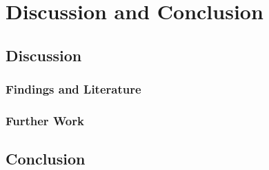 
\chapter{Discussion and Conclusion} %

\label{Chapter6} %


\section{Discussion}
\label{chp6-sec1}

\subsection{Findings and Literature}
\label{chp6-sec1.1}

\subsection{Further Work}
\label{chp6-sec1.2}


\section{Conclusion}
\label{chp6-sec2}








